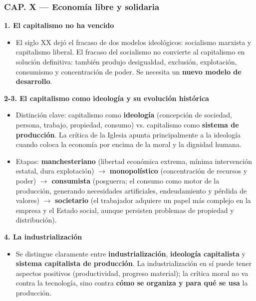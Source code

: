 \documentclass[10pt,a4paper]{article}
\begin{document}
\subsubsection{CAP. X --- Economía libre y solidaria}

\medskip\noindent \textbf{1. El capitalismo no ha vencido}\par\nopagebreak
\begin{itemize}
\item El siglo XX dejó el fracaso de dos modelos ideológicos: socialismo marxista y capitalismo liberal. El fracaso del socialismo no convierte al capitalismo en solución definitiva: también produjo desigualdad, exclusión, explotación, consumismo y concentración de poder. Se necesita un \textbf{nuevo modelo de desarrollo}.
\end{itemize}

\medskip\noindent \textbf{2-3. El capitalismo como ideología y su evolución histórica}\par\nopagebreak
\begin{itemize}
\item Distinción clave: capitalismo como \textbf{ideología} (concepción de sociedad, persona, trabajo, propiedad, consumo) vs. capitalismo como \textbf{sistema de producción}. La crítica de la Iglesia apunta principalmente a la ideología cuando coloca la economía por encima de la moral y la dignidad humana.
\item Etapas: \textbf{manchesteriano} (libertad económica extrema, mínima intervención estatal, dura explotación) $\rightarrow$ \textbf{monopolístico} (concentración de recursos y poder) $\rightarrow$ \textbf{consumista} (posguerra; el consumo como motor de la producción, generando necesidades artificiales, endeudamiento y pérdida de valores) $\rightarrow$ \textbf{societario} (el trabajador adquiere un papel más complejo en la empresa y el Estado social, aunque persisten problemas de propiedad y distribución).
\end{itemize}

\medskip\noindent \textbf{4. La industrialización}\par\nopagebreak
\begin{itemize}
\item Se distingue claramente entre \textbf{industrialización}, \textbf{ideología capitalista} y \textbf{sistema capitalista de producción}. La industrialización en sí puede tener aspectos positivos (productividad, progreso material); la crítica moral no va contra la tecnología, sino contra \textbf{cómo se organiza y para qué se usa} la producción.
\end{itemize}
\end{document}
